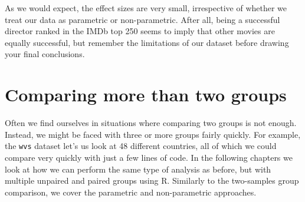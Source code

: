 \documentclass[
]{book}
\newenvironment{Shaded}{\begin{snugshade}}{\end{snugshade}}
\newcommand{\AttributeTok}[1]{\textcolor[rgb]{0.77,0.63,0.00}{#1}}
\newcommand{\CommentTok}[1]{\textcolor[rgb]{0.56,0.35,0.01}{\textit{#1}}}
\newcommand{\ConstantTok}[1]{\textcolor[rgb]{0.00,0.00,0.00}{#1}}
\newcommand{\DocumentationTok}[1]{\textcolor[rgb]{0.56,0.35,0.01}{\textbf{\textit{#1}}}}
\newcommand{\FunctionTok}[1]{\textcolor[rgb]{0.00,0.00,0.00}{#1}}
\newcommand{\NormalTok}[1]{#1}
\newcommand{\OtherTok}[1]{\textcolor[rgb]{0.56,0.35,0.01}{#1}}
\newcommand{\SpecialCharTok}[1]{\textcolor[rgb]{0.00,0.00,0.00}{#1}}
\newcommand{\StringTok}[1]{\textcolor[rgb]{0.31,0.60,0.02}{#1}}
\begin{document}
\begin{Shaded}
\end{Shaded}

As we would expect, the effect sizes are very small, irrespective of whether we treat our data as parametric or non-parametric. After all, being a successful director ranked in the IMDb top 250 seems to imply that other movies are equally successful, but remember the limitations of our dataset before drawing your final conclusions.

\hypertarget{comparing-more-than-two-groups}{%
\section{Comparing more than two groups}\label{comparing-more-than-two-groups}}

Often we find ourselves in situations where comparing two groups is not enough. Instead, we might be faced with three or more groups fairly quickly. For example, the \texttt{wvs} dataset let's us look at 48 different countries, all of which we could compare very quickly with just a few lines of code. In the following chapters we look at how we can perform the same type of analysis as before, but with multiple unpaired and paired groups using R. Similarly to the two-samples group comparison, we cover the parametric and non-parametric approaches.
\end{document}
